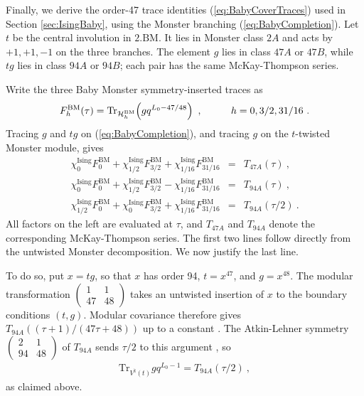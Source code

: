 \documentclass[12pt]{article}
\numberwithin{equation}{section}
\newcommand{\bea}{\begin{eqnarray}}
\newcommand{\eea}{\end{eqnarray}}
\def\no{\nonumber}
\def\cH{\mathcal{H}}
\newcommand{\Tr}{\mathrm{Tr}}
\theoremstyle{remark}
\begin{document}
Finally, we derive the order-47 trace identities (\ref{eq:BabyCoverTraces}) used in Section \ref{sec:IsingBaby}, using the Monster branching (\ref{eq:BabyCompletion}). Let $t$ be the central involution in $2.\mathrm{BM}$. It lies in Monster class $2A$ and acts by $+1,+1,-1$ on the three branches. The element $g$ lies in class $47A$ or $47B$, while $tg$ lies in class $94A$ or $94B$; each pair has the same McKay-Thompson series.

Write the three Baby Monster symmetry-inserted traces as
\bea
F^{\mathrm{BM}}_h(\tau)=\Tr_{\cH^{\mathrm{BM}}_h}\!\left(gq^{L_0-47/48}\right)~,
\hspace{0.4 in}h=0,3/2,31/16~.
\eea
Tracing $g$ and $tg$ on (\ref{eq:BabyCompletion}), and tracing $g$ on the $t$-twisted Monster module, gives
\bea \label{eq:BabyMoonshineSystem}
\chi^{\mathrm{Ising}}_0F^{\mathrm{BM}}_0
+\chi^{\mathrm{Ising}}_{1/2}F^{\mathrm{BM}}_{3/2}
+\chi^{\mathrm{Ising}}_{1/16}F^{\mathrm{BM}}_{31/16}
&=&T_{47A}(\tau)~,\no\\
\chi^{\mathrm{Ising}}_0F^{\mathrm{BM}}_0
+\chi^{\mathrm{Ising}}_{1/2}F^{\mathrm{BM}}_{3/2}
-\chi^{\mathrm{Ising}}_{1/16}F^{\mathrm{BM}}_{31/16}
&=&T_{94A}(\tau)~,\no\\
\chi^{\mathrm{Ising}}_{1/2}F^{\mathrm{BM}}_0
+\chi^{\mathrm{Ising}}_0F^{\mathrm{BM}}_{3/2}
+\chi^{\mathrm{Ising}}_{1/16}F^{\mathrm{BM}}_{31/16}
&=&T_{94A}(\tau/2)~.
\eea
All factors on the left are evaluated at $\tau$, and $T_{47A}$ and $T_{94A}$ denote the corresponding McKay-Thompson series. The first two lines follow directly from the untwisted Monster decomposition. We now justify the last line.


To do so, put $x=tg$, so that $x$ has order 94, $t=x^{47}$, and $g=x^{48}$. The modular transformation $\left(\begin{smallmatrix}1&1\\47&48\end{smallmatrix}\right)$ takes an untwisted insertion of $x$ to the boundary conditions $(t,g)$. Modular covariance therefore gives $T_{94A}((\tau+1)/(47\tau+48))$ up to a constant \cite{Carnahan:2012gx}. The Atkin-Lehner symmetry $\left(\begin{smallmatrix}2&1\\94&48\end{smallmatrix}\right)$ of $T_{94A}$ sends $\tau/2$ to this argument \cite{Conway:1979qga}, so
\bea
\Tr_{V^\natural(t)}gq^{L_0-1}=T_{94A}(\tau/2)~,
\eea
as claimed above.
\end{document}
